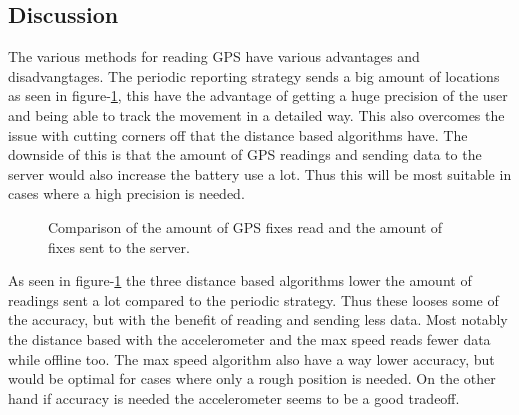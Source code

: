 \subsection{Discussion}
The various methods for reading GPS have various advantages and disadvangtages. The periodic reporting strategy sends a big amount of locations as seen in figure-\ref{locationsreadandsent}, this have the advantage of getting a huge precision of the user and being able to track the movement in a detailed way. This also overcomes the issue with cutting corners off that the distance based algorithms have. The downside of this is that the amount of GPS readings and sending data to the server would also increase the battery use a lot. Thus this will be most suitable in cases where a high precision is needed.

\begin{figure}[h]
\label{locationsreadandsent}
\caption{Comparison of the amount of GPS fixes read and the amount of fixes sent to the server.}
\end{figure}

As seen in figure-\ref{locationsreadandsent} the three distance based algorithms lower the amount of readings sent a lot compared to the periodic strategy. Thus these looses some of the accuracy, but with the benefit of reading and sending less data. Most notably the distance based with the accelerometer and the max speed reads fewer data while offline too. The max speed algorithm also have a way lower accuracy, but would be optimal for cases where only a rough position is needed. On the other hand if accuracy is needed the accelerometer seems to be a good tradeoff.

